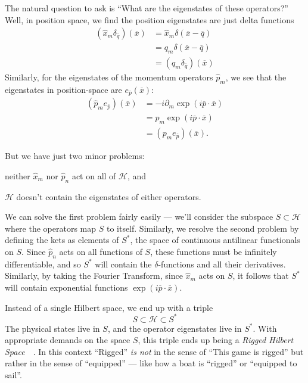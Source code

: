 The natural question to ask is ``What are the eigenstates of
these operators?'' Well, in position space, we find the position
eigenstates are just delta functions
\begin{subequations}
\begin{align}
(\widehat{x}_{m}\delta_{\overline{q}})(\overline{x}) &=
  \widehat{x}_{m}\delta(\overline{x}-\overline{q})\\
&= q_{m}\delta(\overline{x}-\overline{q})\\
&= (q_{m}\delta_{\overline{q}})(\overline{x})
\end{align}
\end{subequations}
Similarly, for the eigenstates of the momentum operators
$\widehat{p}_{m}$, we see that the eigenstates in position-space
are $e_{\overline{p}}(\overline{x})$:
\begin{subequations}
\begin{align}
(\widehat{p}_{m}e_{\overline{p}})(\overline{x}) &= -i\partial_{m}\exp(i\overline{p}\cdot\overline{x})\\
&= p_{m}\exp(i\overline{p}\cdot\overline{x})\\
&= (p_{m}e_{\overline{p}})(\overline{x}).
\end{align}
\end{subequations}

But we have just two minor problems: \begin{inparaenum}
\item neither $\widehat{x}_{m}$ nor $\widehat{p}_{n}$ act on all
  of $\mathcal{H}$, and
\item $\mathcal{H}$ doesn't contain the eigenstates of either
  operators.
\end{inparaenum}
We can solve the first problem fairly easily --- we'll consider
the subspace $S\subset{\mathcal{H}}$ where the operators map $S$
to itself. Similarly, we resolve the second problem by defining
the kets as elements of $S^{*}$, the space of continuous
antilinear functionals on $S$. Since $\widehat{p}_{n}$ acts on
all functions of $S$, these functions must be infinitely
differentiable, and so $S^{*}$ will contain the
$\delta$-functions and all their derivatives. Similarly, by
taking the Fourier Transform, since $\widehat{x}_{m}$ acts on
$S$, it follows that $S^{*}$ will contain exponential functions
$\exp(i\overline{p}\cdot\overline{x})$. 

Instead of a single Hilbert space, we end up with a triple
\begin{equation}%
S\subset{\mathcal{H}}\subset{S^{*}}
\end{equation}
The physical states live in $S$, and the operator eigenstates
live in $S^{*}$. With appropriate demands on the space $S$, 
this triple ends up being a \emph{Rigged Hilbert Space}~\cite{delamadrid}~\cite{Madrid:2004zy}. 
In this context ``Rigged'' \emph{is  not} in the sense of ``This
game is rigged'' but rather in the sense of ``equipped'' --- like
how a boat is ``rigged'' or ``equipped to sail''. \linebreak



